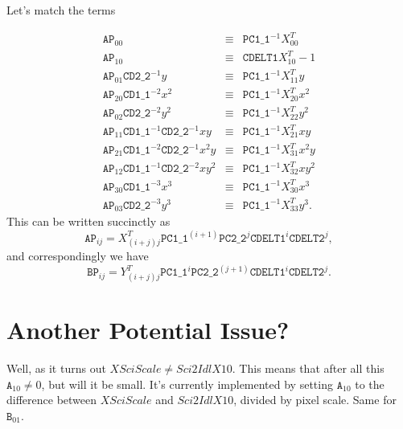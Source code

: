 \documentclass[10pt]{article}
\newcommand{\sipA}[2]{\ensuremath{\mathtt{A}_{#1 #2}}}
\newcommand{\sipB}[2]{\ensuremath{\mathtt{B}_{#1 #2}}}
\newcommand{\sipAP}[2]{\ensuremath{\mathtt{AP}_{#1 #2}}}
\newcommand{\sipBP}[2]{\ensuremath{\mathtt{BP}_{#1 #2}}}
\newcommand{\siafXP}[2]{\ensuremath{X^{T}_{#1 #2}}}
\newcommand{\siafYP}[2]{\ensuremath{Y^{T}_{#1 #2}}}
\newcommand{\NCu}{\ensuremath{\mathtt{PC1\_1}}}
\newcommand{\NCv}{\ensuremath{\mathtt{PC2\_2}}}
\newcommand{\CDu}{\ensuremath{\mathtt{CD1\_1}}}
\newcommand{\CDv}{\ensuremath{\mathtt{CD2\_2}}}
\begin{document}
Let's match the terms


\begin{eqnarray}
\label{eqn:matched_inv}
\sipAP{0}{0} &\equiv& \NCu^{-1} \siafXP{0}{0}\\
\sipAP{1}{0} &\equiv& \mathtt{CDELT1}\siafXP{1}{0} - 1 \\
\sipAP{0}{1} \CDv^{-1} y &\equiv& \NCu^{-1} \siafXP{1}{1} y \\
\sipAP{2}{0} \CDu^{-2} x^2 &\equiv& \NCu^{-1}  \siafXP{2}{0} x^2\\
\sipAP{0}{2} \CDv^{-2} y^2 &\equiv& \NCu^{-1} \siafXP{2}{2} y^2\\
\sipAP{1}{1} \CDu^{-1} \CDv^{-1} xy &\equiv&  \NCu^{-1} \siafXP{2}{1} xy \\
\sipAP{2}{1} \CDu^{-2}\CDv^{-1} x^2y &\equiv& \NCu^{-1} \siafXP{3}{1} x^2 y\\
\sipAP{1}{2} \CDu^{-1}\CDv^{-2} xy^2 &\equiv& \NCu^{-1} \siafXP{3}{2} xy^2 \\
\sipAP{3}{0} \CDu^{-3} x^3&\equiv& \NCu^{-1}  \siafXP{3}{0} x^3 \\
\sipAP{0}{3} \CDv^{-3} y^3&\equiv& \NCu^{-1}  \siafXP{3}{3} y^3.
\end{eqnarray}
\noindent
This can be written succinctly as
\begin{equation}
\sipAP{i}{j} = \siafXP{(i+j)}{j} \NCu^{(i+1)} \NCv^{j} \mathtt{CDELT1}^i \mathtt{CDELT2}^j,
\end{equation}
\noindent
and correspondingly we have
\begin{equation}
\sipBP{i}{j} = \siafYP{(i+j)}{j} \NCu^{i} \NCv^{(j+1)} \mathtt{CDELT1}^i \mathtt{CDELT2}^j.
\end{equation}

\section{Another Potential Issue?}

Well, as it turns out $XSciScale\ne Sci2IdlX10$.  This means that after all this $\sipA{1}{0}\ne0$, but will it be small. It's currently implemented by setting $\sipA{1}{0}$ to the difference between $XSciScale$ and  $Sci2IdlX10$, divided by pixel scale. Same for $\sipB{0}{1}$.
\end{document}
